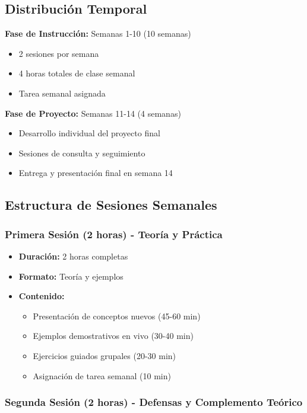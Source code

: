 \documentclass[12pt,letterpaper]{article}
\begin{document}
\subsection{Distribución Temporal}

\textbf{Fase de Instrucción:} Semanas 1-10 (10 semanas)
\begin{itemize}[leftmargin=*]
    \item 2 sesiones por semana
    \item 4 horas totales de clase semanal
    \item Tarea semanal asignada
\end{itemize}

\textbf{Fase de Proyecto:} Semanas 11-14 (4 semanas)
\begin{itemize}[leftmargin=*]
    \item Desarrollo individual del proyecto final
    \item Sesiones de consulta y seguimiento
    \item Entrega y presentación final en semana 14
\end{itemize}

\subsection{Estructura de Sesiones Semanales}

\subsubsection{Primera Sesión (2 horas) - Teoría y Práctica}

\begin{itemize}[leftmargin=*]
    \item \textbf{Duración:} 2 horas completas
    \item \textbf{Formato:} Teoría y ejemplos
    \item \textbf{Contenido:}
    \begin{itemize}
        \item Presentación de conceptos nuevos (45-60 min)
        \item Ejemplos demostrativos en vivo (30-40 min)
        \item Ejercicios guiados grupales (20-30 min)
        \item Asignación de tarea semanal (10 min)
    \end{itemize}
\end{itemize}

\subsubsection{Segunda Sesión (2 horas) - Defensas y Complemento Teórico}
\end{document}
